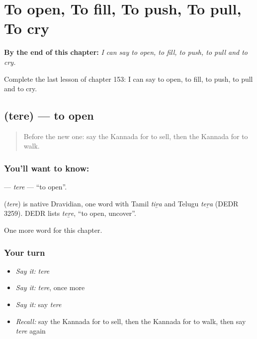 
\chapter{To open, To fill, To push, To pull, To cry}
\label{ch:ka-to-open-to-fill-to-push-to-pull-to-cry}

\begin{chapteropening}
\textbf{By the end of this chapter:} \emph{I can say to open, to fill, to push, to pull and to cry.}

Complete the last lesson of chapter 153: I can say to open, to fill, to push, to pull and to cry.
\end{chapteropening}

\section[\texorpdfstring{\kn{ತೆರೆ} (tere)}{ತೆರೆ (tere)}]{ (tere) — to open}

\label{lesson:KA-C153-tere}



\begin{quote}
Before the new one: say the Kannada for to sell, then the Kannada for to walk.
\end{quote}

\subsection*{You'll want to know: }
\textbf{} — \emph{tere} — \textquotedblleft{}to open\textquotedblright{}.

\begin{cousinweb}
\textbf{} (\emph{tere}) is native Dravidian, one word with Tamil \emph{tiṟa} and Telugu \emph{teṟa} (DEDR 3259). DEDR lists \emph{teṟe}, \textquotedblleft{}to open, uncover\textquotedblright{}.
\end{cousinweb}

\begin{grammarlens}[title={What you've built}]
One more word for this chapter.
\end{grammarlens}

\subsection*{Your turn}
\begin{itemize}
\raggedright
  \item \emph{Say it:} \emph{tere}
  \item \emph{Say it:} \emph{tere}, once more
  \item \emph{Say it:} say \emph{tere}
  \item \emph{Recall:} say the Kannada for to sell, then the Kannada for to walk, then say \emph{tere} again
\end{itemize}

